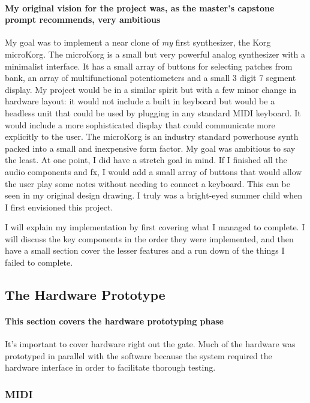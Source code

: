 \documentclass[acmlarge,screen]{acmart}
\begin{document}
	\paragraph{My original vision for the project was, as the master's capstone prompt recommends, very ambitious} My goal was to implement a near clone of \textit{my} first synthesizer, the Korg microKorg. The microKorg is a small but very powerful analog synthesizer with a minimalist interface. It has a small array of buttons for selecting patches from bank, an array of multifunctional potentiometers and a small 3 digit 7 segment display. My project would be in a similar spirit but with a few minor change in hardware layout: it would not include a built in keyboard but would be a headless unit that could be used by plugging in any standard MIDI keyboard. It would include a more sophisticated display that could communicate more explicitly to the user. The microKorg is an industry standard powerhouse synth packed into a small and inexpensive form factor. My goal was ambitious to say the least. \cite{ward_2003} At one point, I did have a stretch goal in mind. If I finished all the audio components and fx, I would add a small array of buttons that would allow the user play some notes without needing to connect a keyboard. This can be seen in my original design drawing. I truly was a bright-eyed summer child when I first envisioned this project.

	I will explain my implementation by first covering what I managed to complete. I will discuss the key components in the order they were implemented, and then have a small section cover the lesser features and a run down of the things I failed to complete.

\subsection{The Hardware Prototype}
	\paragraph{This section covers the hardware prototyping phase} It's important to cover hardware right out the gate. Much of the hardware was prototyped in parallel with the software because the system required the hardware interface in order to facilitate thorough testing.

	\subsubsection{MIDI}
\end{document}
